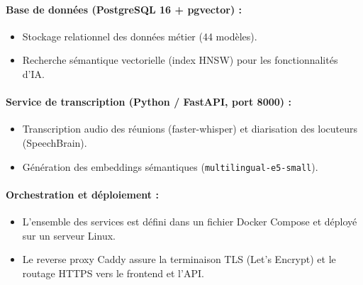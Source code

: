 \paragraph{Base de données (PostgreSQL 16 + pgvector) :}
\begin{itemize}
  \item Stockage relationnel des données métier (44 modèles).
  \item Recherche sémantique vectorielle (index HNSW) pour les fonctionnalités
  d'IA.
\end{itemize}

\paragraph{Service de transcription (Python / FastAPI, port 8000) :}
\begin{itemize}
  \item Transcription audio des réunions (faster-whisper) et diarisation des
  locuteurs (SpeechBrain).
  \item Génération des embeddings sémantiques (\texttt{multilingual-e5-small}).
\end{itemize}

\paragraph{Orchestration et déploiement :}
\begin{itemize}
  \item L'ensemble des services est défini dans un fichier Docker Compose et
  déployé sur un serveur Linux.
  \item Le reverse proxy Caddy assure la terminaison TLS (Let's Encrypt) et le
  routage HTTPS vers le frontend et l'API.
\end{itemize}
